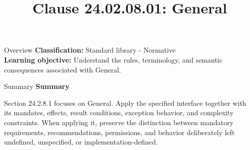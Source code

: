\documentclass[10pt,letterpaper]{article}
\title{Clause 24.02.08.01: General}
\author{}
\date{}
\begin{document}
\maketitle
\begin{CornellOverviewBox}{Overview}
\textbf{Classification:} Standard library - Normative\\[2pt]
\textbf{Learning objective:} Understand the rules, terminology, and semantic consequences associated with General.
\end{CornellOverviewBox}\begin{CornellSummaryBox}{Summary}
{\sffamily\bfseries\color{Accent} Summary}\par\vspace{3pt}Section 24.2.8.1 focuses on General. Apply the specified interface together with its mandates, effects, result conditions, exception behavior, and complexity constraints. When applying it, preserve the distinction between mandatory requirements, recommendations, permissions, and behavior deliberately left undefined, unspecified, or implementation-defined.
\end{CornellSummaryBox}
\end{document}
